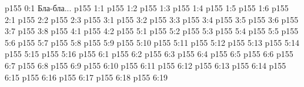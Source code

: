 \author{Промежуточные создания}
\vs p155 0:1  Бла-бла...
\vs p155 1:1 
\vs p155 1:2 
\vs p155 1:3 
\vs p155 1:4 
\vs p155 1:5 
\vs p155 1:6 
\vs p155 2:1 
\vs p155 2:2 
\vs p155 2:3 
\vs p155 3:1 
\vs p155 3:2 
\vs p155 3:3 
\vs p155 3:4 
\vs p155 3:5 
\vs p155 3:6 
\vs p155 3:7 
\vs p155 3:8 
\vs p155 4:1 
\vs p155 4:2 
\vs p155 5:1 
\vs p155 5:2 \pc 
\vs p155 5:3 
\vs p155 5:4 
\vs p155 5:5 
\vs p155 5:6 \pc 
\vs p155 5:7 \pc 
\vs p155 5:8 \pc 
\vs p155 5:9 
\vs p155 5:10 
\vs p155 5:11 
\vs p155 5:12 \pc 
\vs p155 5:13 
\vs p155 5:14 
\vs p155 5:15 
\vs p155 5:16 
\vs p155 6:1 
\vs p155 6:2 \pc 
\vs p155 6:3 \pc 
\vs p155 6:4 
\vs p155 6:5 
\vs p155 6:6 
\vs p155 6:7 
\vs p155 6:8 
\vs p155 6:9 
\vs p155 6:10 
\vs p155 6:11 
\vs p155 6:12 
\vs p155 6:13 
\vs p155 6:14 
\vs p155 6:15 
\vs p155 6:16 \pc 
\vs p155 6:17 \pc 
\vs p155 6:18 
\vs p155 6:19 \pc 
\quizlink
